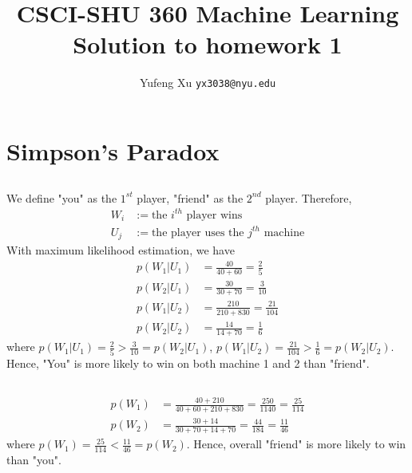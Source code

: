 \documentclass{article}
\title{CSCI-SHU 360 Machine Learning\\
    Solution to homework 1}
\author{Yufeng Xu \texttt{yx3038@nyu.edu}}
\begin{document}
    \maketitle

    \section{Simpson's Paradox}

    \subsection{}\label{1.1}
        We define "you" as the $1^{st}$ player, "friend" as the $2^{nd}$ player. Therefore,
        \begin{align*}
            W_i&:=\text{the $i^{th}$ player wins}\\
            U_j&:=\text{the player uses the $j^{th}$ machine}
        \end{align*}
        With maximum likelihood estimation, we have
        \begin{align*}
            p(W_1|U_1)&=\frac{40}{40+60}=\frac{2}{5}\\
            p(W_2|U_1)&=\frac{30}{30+70}=\frac{3}{10}\\
            p(W_1|U_2)&=\frac{210}{210+830}=\frac{21}{104}\\
            p(W_2|U_2)&=\frac{14}{14+70}=\frac{1}{6}
        \end{align*}
        where $p(W_1|U_1)=\frac{2}{5}>\frac{3}{10}=p(W_2|U_1)$, 
        $p(W_1|U_2)=\frac{21}{104}>\frac{1}{6}=p(W_2|U_2)$. 
        Hence, "You" is more likely to win on both machine 1 and 2 than "friend".
    
    \subsection{}\label{1.2}
        \begin{align*}
            p(W_1)&=\frac{40+210}{40+60+210+830}=\frac{250}{1140}=\frac{25}{114}\\
            p(W_2)&=\frac{30+14}{30+70+14+70}=\frac{44}{184}=\frac{11}{46}
        \end{align*}
        where $p(W_1)=\frac{25}{114}<\frac{11}{46}=p(W_2)$. Hence, 
        overall "friend" is more likely to win than "you".
\end{document}
